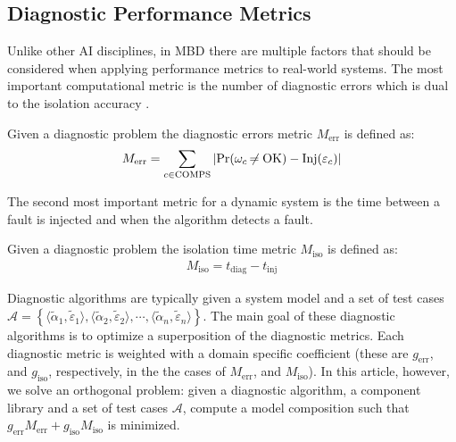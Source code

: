 \subsection{Diagnostic Performance Metrics}
%
Unlike other AI disciplines, in MBD there are multiple factors that
should be considered when applying performance metrics to real-world
systems. The most important computational metric is the number of
diagnostic errors which is dual to the isolation accuracy
\citep{feldman10empirical}.
%
\begin{definition}
%
Given a diagnostic problem \dproblem the diagnostic errors metric
$M_{\mathrm{err}}$ is defined as:
%
\begin{eqnarray}
%
M_{\mathrm{err}} = \sum_{c \in \comps}{\left|\pr(\omega_c \ne \ok) - \inj(\varepsilon_c)\right|}
%
\end{eqnarray}
%
\end{definition}
%
The second most important metric for a dynamic system is the time
between a fault is injected and when the algorithm detects a fault.
%
\begin{definition}
%
Given a diagnostic problem \dproblem the isolation time metric
$M_{\mathrm{iso}}$ is defined as:
%
\begin{eqnarray}
%
M_{\mathrm{iso}} = t_{\mathrm{diag}} - t_{\mathrm{inj}}
%
\end{eqnarray}
%
\end{definition}
%
Diagnostic algorithms are typically given a system model \sd and a set
of test cases $\mathcal{A} = \left\{\langle\tilde\alpha_1,
\tilde\varepsilon_1\rangle, \langle\tilde\alpha_2,
\tilde\varepsilon_2\rangle, \cdots, \langle\tilde\alpha_n,
\tilde\varepsilon_n\rangle\right\}$. The main goal of these diagnostic
algorithms is to optimize a superposition of the diagnostic
metrics. Each diagnostic metric is weighted with a domain specific
coefficient (these are $g_{\mathrm{err}}$, and $g_{\mathrm{iso}}$,
respectively, in the the cases of $M_{\mathrm{err}}$, and
$M_{\mathrm{iso}}$). In this article, however, we solve an orthogonal
problem: given a diagnostic algorithm, a component library and a set
of test cases $\mathcal{A}$, compute a model composition \sd such that
$g_{\mathrm{err}}M_{\mathrm{err}} + g_{\mathrm{iso}}M_{\mathrm{iso}}$
is minimized.

